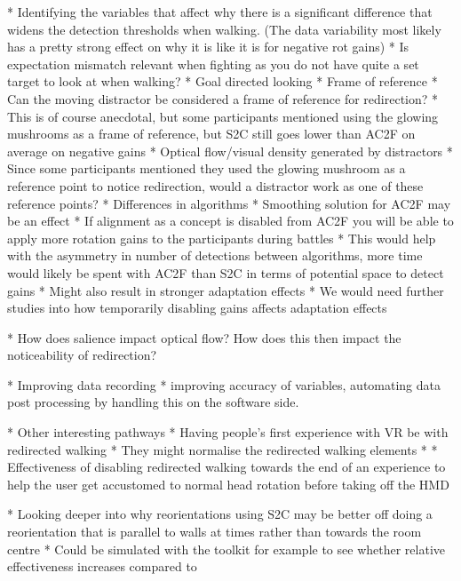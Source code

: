 * Identifying the variables that affect why there is a significant difference that widens the detection thresholds when walking. (The data variability most likely has a pretty strong effect on why it is like it is for negative rot gains)
   * Is expectation mismatch relevant when fighting as you do not have quite a set target to look at when walking?
      * Goal directed looking
   * Frame of reference
      * Can the moving distractor be considered a frame of reference for redirection?
      * This is of course anecdotal, but some participants mentioned using the glowing mushrooms as a frame of reference, but S2C still goes lower than AC2F on average on negative gains
      * Optical flow/visual density generated by distractors
         * Since some participants mentioned they used the glowing mushroom as a reference point to notice redirection, would a distractor work as one of these reference points?
   * Differences in algorithms
      * Smoothing solution for AC2F may be an effect
      * If alignment as a concept is disabled from AC2F you will be able to apply more rotation gains to the participants during battles
         * This would help with the asymmetry in number of detections between algorithms, more time would likely be spent with AC2F than S2C in terms of potential space to detect gains
         * Might also result in stronger adaptation effects
            * We would need further studies into how temporarily disabling gains affects adaptation effects

* How does salience impact optical flow? How does this then impact the noticeability of redirection?

* Improving data recording
   * improving accuracy of variables, automating data post processing by handling this on the software side. 

* Other interesting pathways
   * Having people's first experience with VR be with redirected walking
      * They might normalise the redirected walking elements
         * 
   * Effectiveness of disabling redirected walking towards the end of an experience to help the user get accustomed to normal head rotation before taking off the HMD
   
   * Looking deeper into why reorientations using S2C may be better off doing a reorientation that is parallel to walls at times rather than towards the room centre
      * Could be simulated with the toolkit for example to see whether relative effectiveness increases compared to 
      
